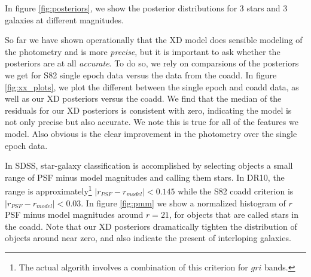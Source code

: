 \documentclass[12pt,preprint]{aastex}
\begin{document}
In figure \ref{fig:posteriors}, we show the posterior distributions for 3
stars and 3 galaxies at different magnitudes.

So far we have shown operationally that the XD model does sensible modeling of
the photometry and is more \emph{precise}, but it is important to ask whether
the posteriors are at all \emph{accurate}.  To do so, we rely on comparsions of
the posteriors we get for S82 single epoch data versus the data from the
coadd.  In figure \ref{fig:xx_plots}, we plot the different between the single
epoch and coadd data, as well as our XD posteriors versus the coadd.  We find
that the median of the residuals for our XD posteriors is consistent with
zero, indicating the model is not only precise but also accurate.  We note
this is true for all of the features we model.  Also obvious is the clear
improvement in the photometry over the single epoch data.

In SDSS, star-galaxy classification is accomplished by selecting objects a
small range of PSF minus model magnitudes and calling them stars.  In DR10,
the range is approximately\footnote{The actual algorith involves a combination
of this criterion for $gri$ bands.} $|r_{PSF} - r_{model}| < 0.145$ while the
S82 coadd criterion is $|r_{PSF} - r_{model}| < 0.03$.  In figure \ref{fig:pmm}
we show a normalized histogram of $r$ PSF minus model magnitudes around
$r=21$, for objects that are called stars in the coadd.  Note that our XD
posteriors dramatically tighten the distribution of objects around near zero,
and also indicate the present of interloping galaxies.
\end{document}
